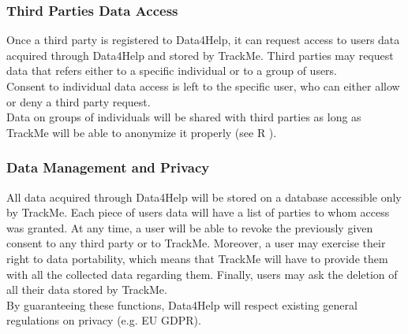 \documentclass[../../rasd.tex]{subfiles}
\begin{document}
			\subsubsection{Third Parties Data Access}
			Once a third party is registered to Data4Help, it can request access to users data acquired through Data4Help and stored by TrackMe. Third parties may request data that refers either to a specific individual or to a group of users.\\
			Consent to individual data access is left to the specific user, who can either allow or deny a third party request.\\
			Data on groups of individuals will be shared with third parties as long as TrackMe will be able to anonymize it properly (see R ).

			\subsubsection{Data Management and Privacy}
			All data acquired through Data4Help will be stored on a database accessible only by TrackMe. Each piece of users data will have a list of parties to whom access was granted. At any time, a user will be able to revoke the previously given consent to any third party or to TrackMe. Moreover, a user may exercise their right to data portability, which means that TrackMe will have to provide them with all the collected data regarding them. Finally, users may ask the deletion of all their data stored by TrackMe. \\
			By guaranteeing these functions, Data4Help will respect existing general regulations on privacy (e.g. EU GDPR). 
\end{document}
